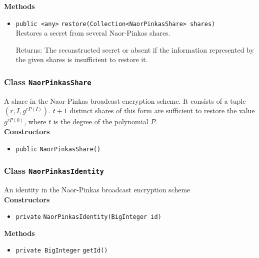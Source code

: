 \textbf{Methods}
\begin{itemize}
\item \lstinline|public <any>| \lstinline|restore|\lstinline|(Collection<NaorPinkasShare> shares)|\\
Restores a secret from several Naor-Pinkas shares.

Returns: The reconstructed secret or absent if the information represented
 by the given shares is insufficient to restore it.

\end{itemize}

\subsubsection{Class \lstinline|NaorPinkasShare|}
A share in the Naor-Pinkas broadcast encryption scheme. It consists of a tuple
 $(r, I, g^{r P(I)})$. $t + 1$ distinct shares of this form are sufficient to restore the
 value $g^{r P(0)}$, where $t$ is the degree of the polynomial $P$. \\




\textbf{Constructors}
\begin{itemize}
\item \lstinline|public| \lstinline|NaorPinkasShare|\lstinline|()|




\end{itemize}


\subsubsection{Class \lstinline|NaorPinkasIdentity|}
An identity in the Naor-Pinkas broadcast encryption scheme \\




\textbf{Constructors}
\begin{itemize}
\item \lstinline|private| \lstinline|NaorPinkasIdentity|\lstinline|(BigInteger id)|




\end{itemize}


\textbf{Methods}
\begin{itemize}
\item \lstinline|private BigInteger| \lstinline|getId|\lstinline|()|




\end{itemize}


